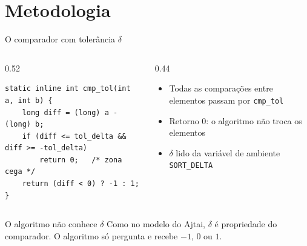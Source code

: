 \documentclass[aspectratio=169,10pt]{beamer}
\begin{document}
\section{Metodologia}

\begin{frame}[fragile]{O comparador com tolerância $\delta$}
  \begin{columns}[T]
    \begin{column}{0.52\textwidth}
\begin{lstlisting}
static inline int cmp_tol(int a, int b) {
    long diff = (long) a - (long) b;
    if (diff <= tol_delta && diff >= -tol_delta)
        return 0;   /* zona cega */
    return (diff < 0) ? -1 : 1;
}
\end{lstlisting}
    \end{column}
    \begin{column}{0.44\textwidth}
      \begin{itemize}
        \item Todas as comparações entre elementos passam por \texttt{cmp\_tol}
        \item Retorno $0$: o algoritmo \alert{não troca} os elementos
        \item $\delta$ lido da variável de ambiente \texttt{SORT\_DELTA}
      \end{itemize}
    \end{column}
  \end{columns}
  \vspace{0.6em}
  \begin{exampleblock}{O algoritmo não conhece $\delta$}
    Como no modelo do Ajtai, $\delta$ é propriedade do comparador.
    O algoritmo só pergunta e recebe $-1$, $0$ ou $1$.
  \end{exampleblock}
\end{frame}
\end{document}
